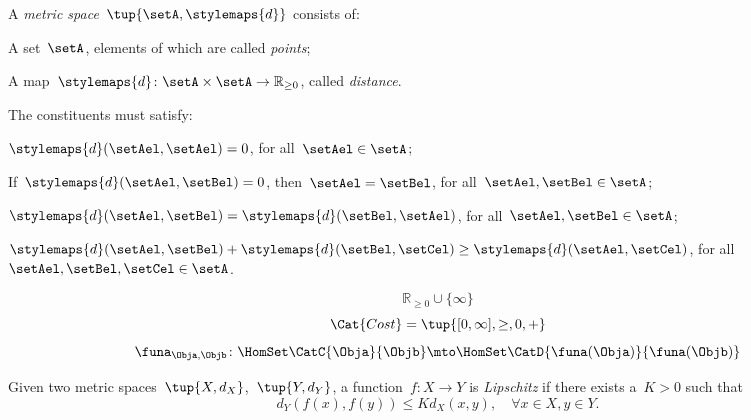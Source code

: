 {\begin{forslides}
\begin{definition}
    \label{def:metric_space}
    A \emph{metric space}~$\tup{\setA,\stylemaps{d}}$ consists of:
    \begin{compactenum}
      \item A set~$\setA$, elements of which are called \emph{points};
      \item A map~$\stylemaps{d}\colon \setA\times \setA \to \mathbb{R}_{\geq 0}$, called \emph{distance}.
    \end{compactenum}
    The constituents must satisfy:
    \begin{compactitem}
      \item $\stylemaps{d}(\setAel,\setAel)=0$, for all~$\setAel\in \setA$;
      \item If~$\stylemaps{d}(\setAel, \setBel)=0$, then~$\setAel=\setBel$, for all~$\setAel,\setBel\in \setA$;
      \item $\stylemaps{d}(\setAel, \setBel)=\stylemaps{d}(\setBel, \setAel)$, for all~$\setAel,\setBel\in \setA$;
      \item $\stylemaps{d}(\setAel, \setBel)+\stylemaps{d}(\setBel, \setCel)\geq \stylemaps{d}(\setAel, \setCel)$, for all~$\setAel,\setBel,\setCel\in \setA$.
    \end{compactitem}
\end{definition}
  \begin{equation*}
    \label{eq:r_with_inft}
    \mathbb{R}_{\geq 0}\cup \{\infty\}
\end{equation*}
  \begin{equation*}
    \label{eq:cost_cat}
    \Cat{Cost}=\tup{[0,\infty], \geq, 0, +}
\end{equation*}
  \begin{equation*}
    \label{eq:enriched_fun_a}
      \funa_{\Obja, \Objb} \colon \HomSet\CatC{\Obja}{\Objb} \mto \HomSet\CatD{\funa(\Obja)}{\funa(\Objb)}
\end{equation*}
  \begin{definition}
    \label{def:cost_enrich_a}
    Given two metric spaces~$\tup{X,d_X}$,~$\tup{Y,d_Y}$, a function~$f\colon X\to Y$ is \emph{Lipschitz} if there exists a~$K>0$ such that
    \begin{equation}
      d_Y(f(x),f(y))\leq Kd_X(x,y),\quad \forall x\in X,y\in Y.
    \end{equation}
\end{definition}
\end{forslides}
}

